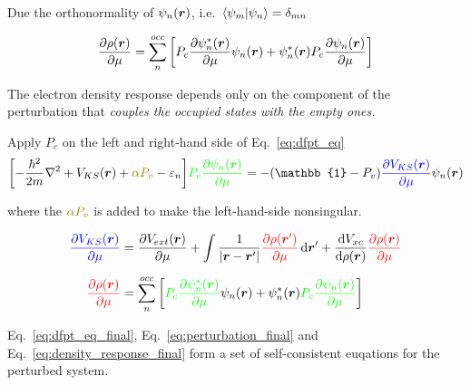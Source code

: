 \begin{frame}[allowframebreaks]
  Due the orthonormality of $\psi_n(\boldsymbol{r})$, i.e.\ $\braket{\psi_m | \psi_n} = \delta_{mn}$

  \begin{equation}
    \label{eq:density_response}
    \frac{
      \partial \rho(\boldsymbol{r})
    }{
      \partial \mu
    }
    =
    \sum_n^{occ}
    \left[
      P_c
        \frac{
        \partial \psi_n^*(\boldsymbol{r})
        }{
        \partial \mu
        }
        \psi_n(\boldsymbol{r})
        +
        \psi_n^*(\boldsymbol{r})
        P_c
        \frac{
        \partial \psi_n(\boldsymbol{r})
        }{
        \partial \mu
        }
    \right]
  \end{equation}

  The electron density response depends only on the component of the
  perturbation that \emph{ couples the occupied states with the empty ones.}

  \break

  Apply $P_c$ on the left and right-hand side of Eq.~\ref{eq:dfpt_eq}
  \begin{equation}
    \label{eq:dfpt_eq_final}
    \biggl[
    -{\hbar^2\over2m}\nabla^2 + V_{KS}(\boldr)
    +
    \mathcolor{olive}{
      \alpha P_v
    }
    - \varepsilon_n
    \biggr]
    \mathcolor{green}{
        P_c
        \frac{
        \partial \psi_n(\boldr)
        }{
        \partial\mu
        }
    }
    =
    -(\mathbb{1} - P_v)
    \mathcolor{blue}{
    \frac{
      \partial V_{KS}(\boldr)
    }{
      \partial\mu
    }
    }
    \psi_n(\boldr)
  \end{equation}

  where the $\mathcolor{olive}{\alpha P_v}$ is added to make the left-hand-side nonsingular.

  \begin{align}
    \mathcolor{blue}{
    \frac{
      \partial V_{KS}(\boldr)
    }{
      \partial \mu
    }}
    &=
    \frac{
      \partial V_{ext}(\boldr)
    }{
      \partial \mu
    }
    +
    \int \frac{
      1
    }{
      |\boldr - \boldr'|
    }
    \mathcolor{red}{
      \frac{
      \partial \rho(\boldr')
      }{
      \partial \mu
    }} \, \mathrm{d}\boldr'
    +
    \frac{
      \mathrm{d} V_{xc}
    }{
      \mathrm{d} \rho(\boldr)
    }
    \mathcolor{red}{
      \frac{
      \partial \rho(\boldr)
      }{
      \partial \mu
    }} \label{eq:perturbation_final}
    \\[6pt]
    \mathcolor{red}{
        \frac{
        \partial \rho(\boldr)
        }{
        \partial \mu
        }
    }
    &=
    \sum_n^{occ}
    \left[
      \mathcolor{green}{
        P_c
        \frac{
        \partial \psi_n^*(\boldr)
        }{
        \partial \mu
        }
      }
      \psi_n(\boldr)
      +
      \psi_n^*(\boldr)
      \mathcolor{green}{
        P_c
        \frac{
        \partial \psi_n(\boldr)
        }{
        \partial \mu
        }
      }
    \right]
    \label{eq:density_response_final}
  \end{align}

  Eq.~\ref{eq:dfpt_eq_final}, Eq.~\ref{eq:perturbation_final} and
  Eq.~\ref{eq:density_response_final} form a set of self-consistent euqations
  for the perturbed system.

\end{frame}

